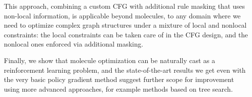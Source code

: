 \documentclass{article}
\begin{document}
This approach, combining a custom CFG with additional rule masking that uses non-local information, is applicable beyond molecules, to any domain where we need to optimize complex graph structures under a mixture of local and nonlocal constraints: the local constraints can be taken care of in the CFG design, and the nonlocal ones enforced via additional masking.

Finally, we show that molecule optimization can be naturally cast as a reinforcement learning problem, and the state-of-the-art results we get even with the very basic policy gradient method suggest further scope for improvement using more advanced approaches, for example methods based on tree search.



\end{document}
